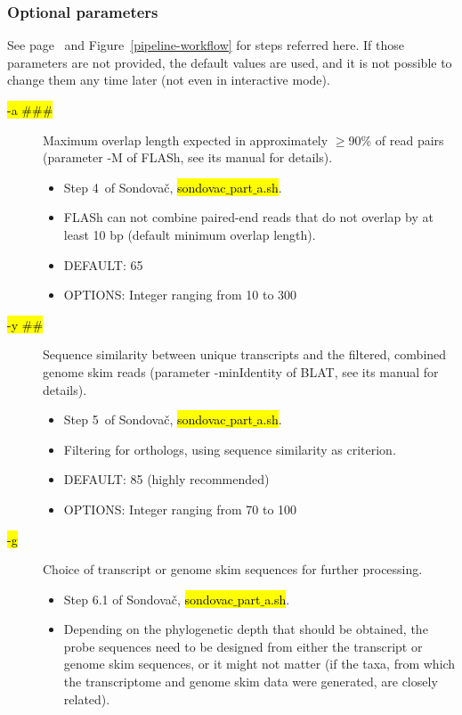 \documentclass[a4paper, 11pt, twoside]{article}
\renewcommand{\texttt}[1]{\hl{\ttfamily #1}}
\begin{document}
\subsubsection{Optional parameters}

See page~\pageref{pipeline-overview} and Figure~\ref{pipeline-workflow} for steps referred here. If those parameters are not provided, the default values are used, and it is not possible to change them any time later (not even in interactive mode).

\begin{description}
\item[\texttt{-a \#\#\#}] Maximum overlap length expected in approximately $\geq$90\% of read pairs (parameter -M of FLASh, see its manual for details).
  \begin{itemize}
    \item Step 4~of Sondovač, \texttt{sondovac$\_$part$\_$a.sh}.
    \item FLASh can not combine paired-end reads that do not overlap by at least 10 bp (default minimum overlap length).
    \item DEFAULT: 65
    \item OPTIONS: Integer ranging from 10 to 300
  \end{itemize}
\item[\texttt{-y \#\#}] Sequence similarity between unique transcripts and the filtered, combined genome skim reads (parameter -minIdentity of BLAT, see its manual for details).
  \begin{itemize}
    \item Step 5~of Sondovač, \texttt{sondovac$\_$part$\_$a.sh}.
    \item Filtering for orthologs, using sequence similarity as criterion.
    \item DEFAULT: 85 (highly recommended)
    \item OPTIONS: Integer ranging from 70 to 100
  \end{itemize}
\item[\texttt{-g}] Choice of transcript or genome skim sequences for further processing.
  \begin{itemize}
    \item Step 6.1 of Sondovač, \texttt{sondovac$\_$part$\_$a.sh}.
    \item Depending on the phylogenetic depth that should be obtained, the probe sequences need to be designed from either the transcript or genome skim sequences, or it might not matter (if the taxa, from which the transcriptome and genome skim data were generated, are closely related).

\end{itemize}
\end{description}
\end{document}
